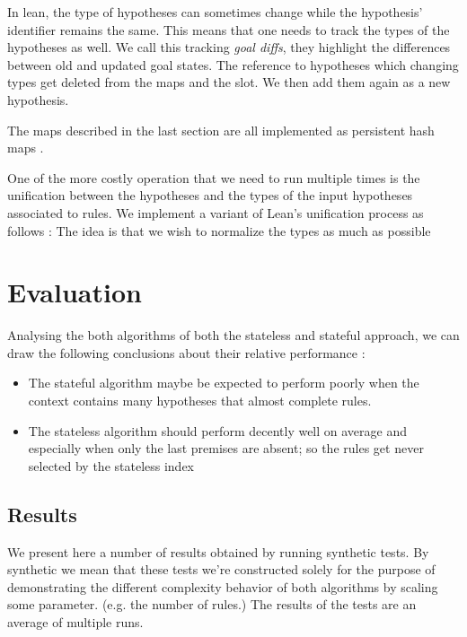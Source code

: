 \documentclass[runningheads]{llncs}
\newcommand{\xcom}[1]{{\color{cyan}{Xavier: #1}} }
\begin{document}
\xcom{Incrementality?}
In lean, the type of hypotheses can sometimes change while the hypothesis'
identifier remains the same. This means that one needs to track the types
of the hypotheses as well. We call this tracking \textit{goal diffs}, they
highlight the differences between old and updated goal states.
The reference to hypotheses which changing types get deleted from the maps
and the slot. We then add them again as a new hypothesis.

The maps described in the last section are all implemented as persistent
hash maps \xcom{Why did we not use discrimination trees? $+$
(pers. important cause we store related forward state for many goal.) }.

One of the more costly operation that we need to run multiple times is the
unification \xcom{defeq?} between the hypotheses and the types of the
input hypotheses associated to rules.
We implement a variant of Lean's unification process as follows :
The idea is that we wish to normalize the types as much as possible

\xcom{precompilation}


\section{Evaluation}

Analysing the both algorithms of both the stateless and stateful approach, we 
can draw the following conclusions about their relative performance :

\begin{itemize}
    \item The stateful algorithm maybe be expected to perform poorly when the
    context contains many hypotheses that almost complete rules.
    \item The stateless algorithm should perform decently well on average and 
    especially when only the last premises are absent; so the rules get never
    selected by the stateless index
\end{itemize}

\subsection{Results}
\xcom{TODO: Add a comment on the effect it had on Mathlib.}

We present here a number of results obtained by running synthetic tests.
By synthetic we mean that these tests we're constructed solely for the
purpose of demonstrating the different complexity behavior of both
algorithms by scaling some parameter. (e.g. the number of rules.)
The results of the tests are an average of multiple runs.
\end{document}
